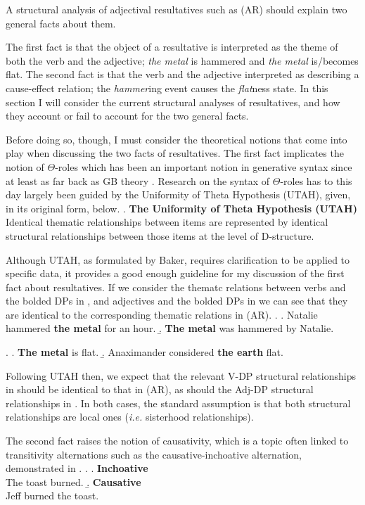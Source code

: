 \documentclass[MilwayThesis]{subfiles}
\begin{document}
A structural analysis of adjectival resultatives such as (AR) should explain two general facts about them.
\AREx{}

The first fact is that the object of a resultative is interpreted as the theme of both the verb and the adjective; \textit{the metal} is hammered and \textit{the metal} is/becomes flat.
The second fact is that the verb and the adjective interpreted as describing a cause-effect relation; the \textit{hammer}ing event causes the \textit{flat}ness state.
In this section I will consider the current structural analyses of resultatives, and how they account or fail to account for the two general facts.

Before doing so, though, I must consider the theoretical notions that come into play when discussing the two facts of resultatives.
The first fact implicates the notion of $\Theta$-roles which has been an important notion in generative syntax since at least as far back as GB theory \parencite{chomsky1981lectures}.
Research on the syntax of $\Theta$-roles has to this day largely been guided by the Uniformity of Theta Hypothesis (UTAH), given, in its original form, below.
\ex. \textbf{The Uniformity of Theta Hypothesis (UTAH)}\\
Identical thematic relationships between items are represented by identical structural relationships between those items at the level of D-structure. \parencite[46]{baker1988incorporation}

Although UTAH, as formulated by Baker, requires clarification to be applied to specific data, it provides a good enough guideline for my discussion of the first fact about resultatives.
If we consider the thematc relations between verbs and the bolded DPs in \Next, and adjectives and the bolded DPs in \NNext we can see that they are identical to the corresponding thematic relations in (AR).
\ex. 
\a. Natalie hammered \textbf{the metal} for an hour.
\b. \textbf{The metal} was hammered by Natalie.

\ex. 
\a. \textbf{The metal} is flat.
\b. Anaximander considered \textbf{the earth} flat.

Following UTAH then, we expect that the relevant V-DP structural relationships in \LLast should be identical to that in (AR), as should the Adj-DP structural relationships in \Last.
In both cases, the standard assumption is that both structural relationships are local ones (\textit{i.e.} sisterhood relationships).

The second fact raises the notion of causativity, which is a topic often linked to transitivity alternations such as the causative-inchoative alternation, demonstrated in \Next.
\ex.
\a. \textbf{Inchoative}\\
The toast burned.
\b. \textbf{Causative}\\
Jeff burned the toast.
\end{document}
